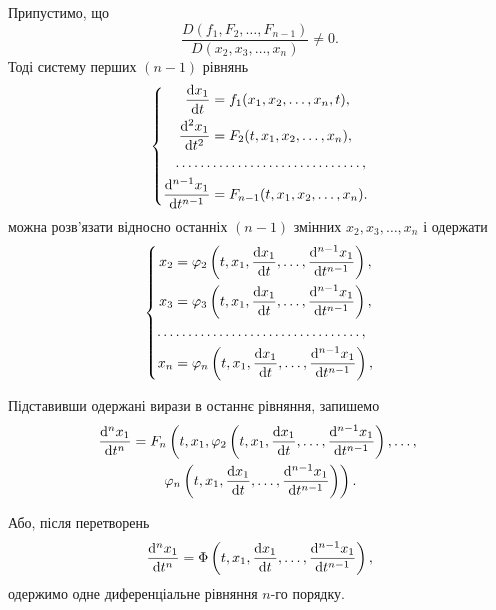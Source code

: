 Припустимо, що \[\frac{D(f_1, F_2, \ldots, F_{n - 1})}{D(x_2, x_3, \ldots, x_n)} \ne 0.\] Тоді систему перших $(n - 1)$ рівнянь 
\begin{equation*}
	\left\{
		\begin{aligned}
			\frac{\mathop{}\!\mathrm{d} x_1}{\mathop{}\!\mathrm{d} t} &= f_1 (x_1, x_2, \ldots, x_n, t), \\
			\frac{\mathop{}\!\mathrm{d}^2 x_1}{\mathop{}\!\mathrm{d} t^2} &= F_2(t, x_1, x_2, \ldots, x_n), \\
			\ldots \ldots & \ldots \ldots \ldots \ldots \ldots \ldots \ldots \ldots, \\
			\frac{\mathop{}\!\mathrm{d}^{n - 1} x_1}{\mathop{}\!\mathrm{d} t^{n - 1}} &= F_{n - 1}(t, x_1, x_2, \ldots, x_n).
		\end{aligned}
	\right.
\end{equation*}
можна розв'язати відносно останніх $(n - 1)$ змінних $x_2, x_3, \ldots, x_n$ і одержати
\begin{equation*}
	\left\{
		\begin{aligned}
			x_2 &= \phi_2 \left( t, x_1, \frac{\diff x_1}{\diff t}, \ldots, \frac{\diff^{n - 1} x_1}{\diff t^{n - 1}} \right), \\
			x_3 &= \phi_3 \left( t, x_1, \frac{\diff x_1}{\diff t}, \ldots, \frac{\diff^{n - 1} x_1}{\diff t^{n - 1}} \right), \\
			\ldots & \ldots \ldots \ldots \ldots \ldots \ldots \ldots \ldots \ldots \ldots, \\
			x_n &= \phi_n \left( t, x_1, \frac{\diff x_1}{\diff t}, \ldots, \frac{\diff^{n - 1} x_1}{\diff t^{n - 1}} \right), \\
		\end{aligned}
	\right.
\end{equation*}

Підставивши одержані вирази в останнє рівняння, запишемо
\begin{multline*}
	\frac{\diff^n x_1}{\diff t^n} = F_n \left( t, x_1, \phi_2 \left( t, x_1, \frac{\diff x_1}{\diff t}, \ldots, \frac{\diff^{n - 1} x_1}{\diff t^{n - 1}} \right), \ldots, \right. \\ \left. \phi_n \left( t, x_1, \frac{\diff x_1}{\diff t}, \ldots, \frac{\diff^{n - 1} x_1}{\diff t^{n - 1}} \right) \right).	
\end{multline*}

Або, після перетворень
\begin{equation*}
	\frac{\mathop{}\!\mathrm{d}^n x_1}{\mathop{}\!\mathrm{d} t^n} = \Phi \left( t, x_1, \frac{\mathop{}\!\mathrm{d} x_1}{\mathop{}\!\mathrm{d} t}, \ldots, \frac{\mathop{}\!\mathrm{d}^{n - 1} x_1}{\mathop{}\!\mathrm{d} t^{n - 1}} \right),
\end{equation*}
одержимо одне диференціальне рівняння $n$-го порядку. \parvskip

